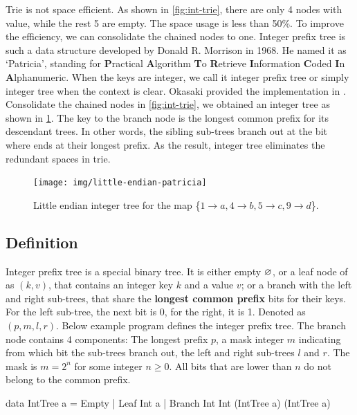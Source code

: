 \documentclass[b5paper]{article}
\begin{document}
Trie is not space efficient. As shown in \cref{fig:int-trie}, there are only 4 nodes with value, while the rest 5 are empty. The space usage is less than 50\%. To improve the efficiency, we can consolidate the chained nodes to one. Integer prefix tree is such a data structure developed by Donald R. Morrison in 1968. He named it as `Patricia', standing for \textbf{P}ractical \textbf{A}lgorithm \textbf{T}o \textbf{R}etrieve \textbf{I}nformation \textbf{C}oded \textbf{I}n \textbf{A}lphanumeric\cite{patricia-morrison}. When the keys are integer, we call it integer prefix tree or simply integer tree when the context is clear. Okasaki provided the implementation in \cite{okasaki-int-map}. Consolidate the chained nodes in \cref{fig:int-trie}, we obtained an integer tree as shown in \cref{fig:little-endian-patricia}. The key to the branch node is the longest common prefix for its descendant trees. In other words, the sibling sub-trees branch out at the bit where ends at their longest prefix. As the result, integer tree eliminates the redundant spaces in trie.

\begin{figure}[htbp]
  \centering
  \texttt{[image: img/little-endian-patricia]}
  \caption{Little endian integer tree for the map
     \{$ 1 \rightarrow a, 4 \rightarrow b, 5 \rightarrow c, 9 \rightarrow d$\}.}
  \label{fig:little-endian-patricia}
\end{figure}

\subsection{Definition}

Integer prefix tree is a special binary tree. It is either empty $\varnothing$, or a leaf node of as $(k, v)$, that contains an integer key $k$ and a value $v$; or a branch with the left and right sub-trees, that share the \textbf{longest common prefix} bits for their keys. For the left sub-tree, the next bit is 0, for the right, it is 1. Denoted as $(p, m, l, r)$. Below example program defines the integer prefix tree. The branch node contains 4 components: The longest prefix $p$, a mask integer $m$ indicating from which bit the sub-trees branch out, the left and right sub-trees $l$ and $r$. The mask is $m = 2^n$ for some integer $n \geq 0$. All bits that are lower than $n$ do not belong to the common prefix.

\begin{Haskell}
data IntTree a = Empty
               | Leaf Int a
               | Branch Int Int (IntTree a) (IntTree a)
\end{Haskell}
\end{document}
